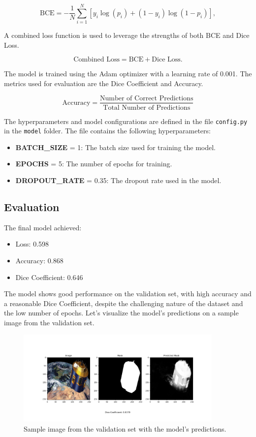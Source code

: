 \documentclass{article}
\begin{document}
\[
\text{BCE} = -\frac{1}{N} \sum_{i=1}^{N} [y_i \log(p_i) + (1 - y_i) \log(1 - p_i)],
\]

A combined loss function is used to leverage the strengths of both BCE and Dice Loss.

\[
\text{Combined Loss} = \text{BCE} + \text{Dice Loss}.
\]

The model is trained using the Adam optimizer with a learning rate of 0.001. The metrics used for evaluation 
are the Dice Coefficient and Accuracy.

\[
\text{Accuracy} = \frac{\text{Number of Correct Predictions}}{\text{Total Number of Predictions}}
\]
\vspace{1em}

The hyperparameters and model configurations are defined in the file \texttt{config.py} in the \texttt{model} folder.
The file contains the following hyperparameters:
 
\begin{itemize}
    \item \textbf{BATCH\_SIZE} = 1: The batch size used for training the model.
    \item \textbf{EPOCHS} = 5: The number of epochs for training.
    \item \textbf{DROPOUT\_RATE} = 0.35: The dropout rate used in the model.
\end{itemize}

\subsection{Evaluation}
The final model achieved:
\begin{itemize}
    \item Loss: 0.598
    \item Accuracy: 0.868
    \item Dice Coefficient: 0.646
\end{itemize}

The model shows good performance on the validation set, with high accuracy and a reasonable Dice Coefficient, 
despite the challenging nature of the dataset and the low number of epochs. Let's visualize the model's 
predictions on a sample image from the validation set.

\begin{figure}[h]
    \centering
    \includegraphics[width=0.9\textwidth]{../images/output_sample.png}
    \caption{Sample image from the validation set with the model's predictions.}
    \label{fig:sample_predictions}
\end{figure}
\end{document}
